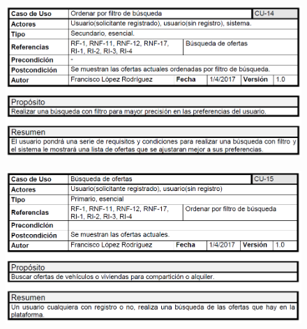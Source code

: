 	\begin{figure}[h!]
		\centering
		\includegraphics[width=0.9\linewidth]{img/casos/ofertas/filtro_busqueda}
		\label{fig:filtrobusqueda}
	\end{figure}
\clearpage
	\begin{figure}[h!]
		\centering
		\includegraphics[width=0.9\linewidth]{img/casos/ofertas/busqueda_ofertas}
		\label{fig:busquedaofertas}
	\end{figure}
	
